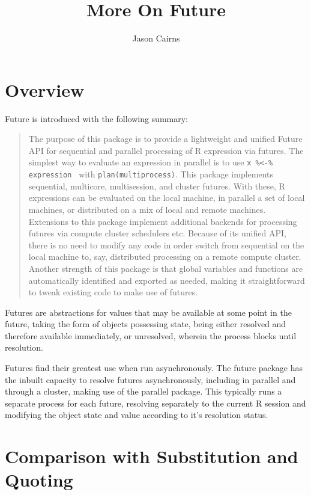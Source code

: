 \documentclass[10pt,a4paper]{article}
\begin{document}
\title{More On Future}
\author{Jason Cairns}
\maketitle{}

\section{Overview}
\label{sec:overview}
\nocite{bengtsson19:_futur_r}

Future is introduced with the following summary: \blockquote{The
  purpose of this package is to provide a lightweight and unified
  Future API for sequential and parallel processing of R expression
  via futures. The simplest way to evaluate an expression in parallel
  is to use \texttt{x \%<-\% { expression }} with
  \texttt{plan(multiprocess)}. This package implements sequential,
  multicore, multisession, and cluster futures. With these, R
  expressions can be evaluated on the local machine, in parallel a set
  of local machines, or distributed on a mix of local and remote
  machines. Extensions to this package implement additional backends
  for processing futures via compute cluster schedulers etc. Because
  of its unified API, there is no need to modify any code in order
  switch from sequential on the local machine to, say, distributed
  processing on a remote compute cluster. Another strength of this
  package is that global variables and functions are automatically
  identified and exported as needed, making it straightforward to
  tweak existing code to make use of futures.\cite{bengtsson20}}
Futures are abstractions for values that may be available at some
point in the future, taking the form of objects possessing state,
being either resolved and therefore available immediately, or
unresolved, wherein the process blocks until resolution.

Futures find their greatest use when run asynchronously. The future
package has the inbuilt capacity to resolve futures asynchronously,
including in parallel and through a cluster, making use of the
parallel package. This typically runs a separate process for each
future, resolving separately to the current R session and modifying
the object state and value according to it's resolution status.

\section{Comparison with Substitution and Quoting}
\label{sec:comparison-with-non}
\end{document}
